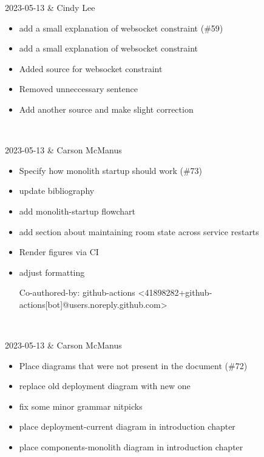 2023-05-13 & Cindy Lee
\begin{itemize}[topsep=0pt,itemsep=0pt,parsep=0pt,partopsep=0pt,leftmargin=12pt]
\item add a small explanation of websocket constraint (\#59)

\item add a small explanation of websocket constraint

\item Added source for websocket constraint

\item Removed unneccessary sentence

\item Add another source and make slight correction
\end{itemize}
\\ \hline

2023-05-13 & Carson McManus
\begin{itemize}[topsep=0pt,itemsep=0pt,parsep=0pt,partopsep=0pt,leftmargin=12pt]
\item Specify how monolith startup should work (\#73)

\item update bibliography

\item add monolith-startup flowchart

\item add section about maintaining room state across service restarts

\item Render figures via CI

\item adjust formatting



Co-authored-by: github-actions <41898282+github-actions[bot]@users.noreply.github.com>
\end{itemize}
\\ \hline

2023-05-13 & Carson McManus
\begin{itemize}[topsep=0pt,itemsep=0pt,parsep=0pt,partopsep=0pt,leftmargin=12pt]
\item Place diagrams that were not present in the document (\#72)

\item replace old deployment diagram with new one

\item fix some minor grammar nitpicks

\item place deployment-current diagram in introduction chapter

\item place components-monolith diagram in introduction chapter
\end{itemize}
\\ \hline

